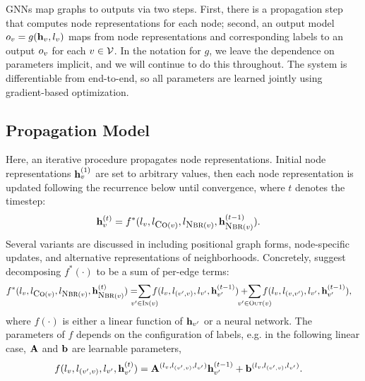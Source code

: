 \documentclass{article} %
\begin{document}
GNNs map graphs to outputs via two steps. First, there is a propagation
step that computes node representations for each node; second, an
output model $o_v = g(\mathbf{h}_{v}, l_{v})$ 
maps from node representations and corresponding labels to an output $o_{v}$
for each $v \in \mathcal{V}$. In the notation for $g$, we leave the dependence on
parameters implicit, and we will continue to do this throughout.
The system is differentiable from end-to-end,
so all parameters are learned jointly using gradient-based optimization.

\subsection{Propagation Model}
Here, an iterative procedure propagates node representations.
Initial node representations $\mathbf{h}_{v}^{(1)}$ are set to arbitrary values,
then each node representation is updated following the recurrence below until
convergence, where $t$ denotes the timestep:
\begin{align*}
    \noderept{\node}{t} & = f^*(\labels_{\node}, 
                      \labels_{\co(\node)},
                      \labels_{\neighbor(\node)},
                      \noderept{\neighbor(\node)}{t-1}
                      ).
\end{align*}
%
Several variants are discussed in \cite{scarselli2009graph}
including positional graph forms, node-specific updates, and
alternative representations of neighborhoods. Concretely,
\cite{scarselli2009graph} suggest decomposing $f^*(\cdot)$ to be
a sum of per-edge terms:
\begin{align*}
f^*(\labels_{\node}, 
  \labels_{\co(\node)},
  \labels_{\neighbor(\node)},
  \noderept{\neighbor(\node)}{t}) & = \!\!\!\!\!\!
  \sum_{\node' \in \inc(\node)} \!\!\!\!\!
  f(\labels_{\node}, \labels_{(\node', \node)}, 
  \labels_{\node'},\noderept{\node'}{t-1})
  +\!\!\!\!\!\!\!\!\sum_{\node' \in \out(\node)} \!\!\!\!\!\!\!
  f(\labels_{\node}, \labels_{(\node, \node')}, 
  \labels_{\node'},\noderept{\node'}{t-1}),
\end{align*}
%
where $f(\cdot)$ is either a linear function of $\mathbf{h}_{v'}$
or a neural network. The parameters of $f$ depends on the configuration of
labels, e.g. in the following linear case, $\mathbf{A}$ and $\mathbf{b}$ are learnable
parameters,
\begin{align*}
  f(l_{v}, l_{(v', v)}, 
  l_{v'},\mathbf{h}_{v'}^{(t)})
  & = \mathbf{A}^{(l_{v}, l_{(v', v)}, l_{v'})}
  \mathbf{h}_{v'}^{(t-1)}
  + \mathbf{b}^{(l_{v}, l_{(v', v)}, l_{v'})}.
\end{align*}
\end{document}
